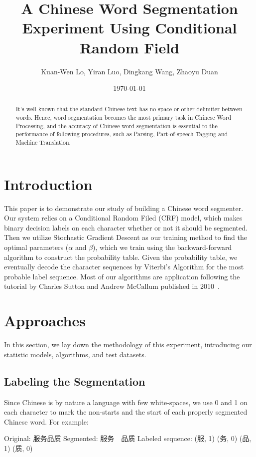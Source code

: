 \documentclass[UTF8,11pt]{article}
\title {\vspace*{-2em}A Chinese Word Segmentation Experiment Using Conditional Random Field}
\author{Kuan-Wen Lo, Yiran Luo, Dingkang Wang, Zhaoyu Duan}
\date {\today}
\begin{document}

\maketitle

\begin{abstract}
\noindent It's well-known that the standard Chinese text has no space or other delimiter between words. Hence, word segmentation becomes the most primary task in Chinese Word Processing, and the accuracy of Chinese word segmentation is essential to the performance of following procedures, such as Parsing, Part-of-speech Tagging and Machine Translation.
\end{abstract}

\section{Introduction}
\noindent This paper is to demonstrate our study of building a Chinese word segmenter. Our system relies on a Conditional Random Filed (CRF) model, which makes binary decision labels on each character whether or not it should be segmented. Then we utilize Stochastic Gradient Descent as our training method to find the optimal parameters ($\alpha$ and $\beta$), which we train using the backward-forward algorithm to construct the probability table. Given the probability table, we eventually decode the character sequences by Viterbi's Algorithm for the most probable label sequence. Most of our algorithms are application following the tutorial by Charles Sutton and Andrew McCallum published in 2010~\cite{basicmethod}.

\section{Approaches}
\noindent In this section, we lay down the methodology of this experiment, introducing our statistic models, algorithms, and test datasets.
\subsection{Labeling the Segmentation}
\noindent Since Chinese is by nature a language with few white-spaces, we use 0 and 1 on each character to mark the non-starts and the start of each properly segmented Chinese word. For example: \newline

\begin{CJK*}{UTF8}{gbsn}
Original: 服务品质 \newline
\indent Segmented: 服务\ \ 品质 \newline
\indent Labeled sequence: (服, 1) (务, 0) (品, 1) (质, 0)
\end{CJK*}
\end{document}
